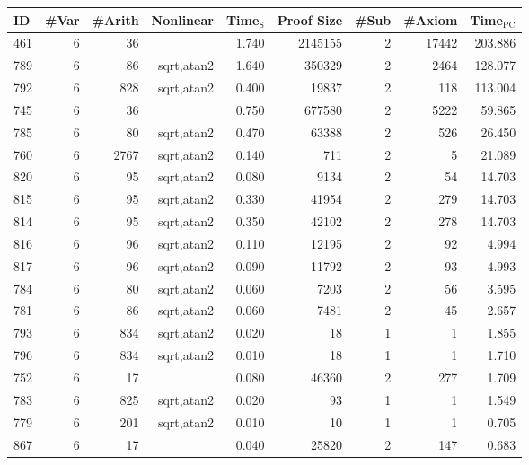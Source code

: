 \begin{table}[h!]
  \begin{center}
\begin{tabular}{|l||r|r|r||r|r|r|r|r|}
\hline
ID & \#Var & \#Arith & Nonlinear & Time$_{\text{S}}$ & Proof Size & \#Sub & \#Axiom & Time$_{\text{PC}}$ \\
\hline
\hline
461 & 6 & 36 &  & 1.740 & 2145155 & 2 & 17442 & 203.886 \\
789 & 6 & 86 & sqrt,atan2 & 1.640 & 350329 & 2 & 2464 & 128.077 \\
792 & 6 & 828 & sqrt,atan2 & 0.400 & 19837 & 2 & 118 & 113.004 \\
745 & 6 & 36 &  & 0.750 & 677580 & 2 & 5222 & 59.865 \\
785 & 6 & 80 & sqrt,atan2 & 0.470 & 63388 & 2 & 526 & 26.450 \\
760 & 6 & 2767 & sqrt,atan2 & 0.140 & 711 & 2 & 5 & 21.089 \\
820 & 6 & 95 & sqrt,atan2 & 0.080 & 9134 & 2 & 54 & 14.703 \\
815 & 6 & 95 & sqrt,atan2 & 0.330 & 41954 & 2 & 279 & 14.703 \\
814 & 6 & 95 & sqrt,atan2 & 0.350 & 42102 & 2 & 278 & 14.703 \\
816 & 6 & 96 & sqrt,atan2 & 0.110 & 12195 & 2 & 92 & 4.994 \\
817 & 6 & 96 & sqrt,atan2 & 0.090 & 11792 & 2 & 93 & 4.993 \\
784 & 6 & 80 & sqrt,atan2 & 0.060 & 7203 & 2 & 56 & 3.595 \\
781 & 6 & 86 & sqrt,atan2 & 0.060 & 7481 & 2 & 45 & 2.657 \\
793 & 6 & 834 & sqrt,atan2 & 0.020 & 18 & 1 & 1 & 1.855 \\
796 & 6 & 834 & sqrt,atan2 & 0.010 & 18 & 1 & 1 & 1.710 \\
752 & 6 & 17 &  & 0.080 & 46360 & 2 & 277 & 1.709 \\
783 & 6 & 825 &sqrt,atan2 & 0.020 & 93 & 1 & 1 & 1.549 \\
779 & 6 & 201 & sqrt,atan2 & 0.010 & 10 & 1 & 1 & 0.705 \\
867 & 6 & 17 &  & 0.040 & 25820 & 2 & 147 & 0.683 \\

\end{tabular}
\end{center}
\end{table}
